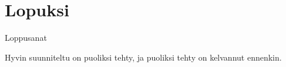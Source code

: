 \documentclass{beamer}
\begin{document}
\section{Lopuksi}

\begin{frame}{Loppusanat}
	\begin{csquotes}
		Hyvin suunniteltu on puoliksi tehty,
		ja puoliksi tehty on kelvannut ennenkin.
	\end{csquotes}
\end{frame}


\begin{frame}

\end{frame}
\end{document}
